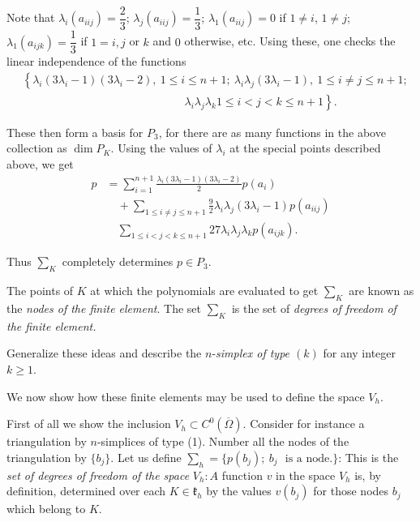 \begin{example}
Note that $\lambda_{i}(a_{iij})=\dfrac{2}{3}$;
$\lambda_{j}(a_{iij})=\dfrac{1}{3}$; $\lambda_{1}(a_{iij})=0$ if
$1\neq i$, $1\neq j$; $\lambda_{1}(a_{ijk})=\dfrac{1}{3}$ if $1=i,j$
or $k$ and $0$ otherwise, etc. Using these, one checks the linear
independence of the functions
\begin{align*}
&  \left\{\lambda_{i}(3\lambda_{i}-1)(3\lambda_{i}-2),\ 1\leq i\leq
n+1;\ \lambda_{i}\lambda_{j}(3\lambda_{i}-1),\ 1\leq i\neq j\leq
n+1; \right.\\
& \hspace{6cm} \left.  \lambda_{i}\lambda_{j}\lambda_{k}1\leq i<j<k\leq n+1\right\}.
\end{align*}

These then form a basis for $P_{3}$, for there are as many functions
in the above collection as $\dim P_{K}$. Using the values of
$\lambda_{i}$ at the special points described above, we get
\begin{equation*}
\begin{split}
p &=
\sum^{n+1}_{i=1}\frac{\lambda_{i}(3\lambda_{i}-1)(3\lambda_{i}-2)}{2}p(a_{i})\\
&\quad + \sum_{1\leq i\neq j\leq
  n+1}\frac{9}{2}\lambda_{i}\lambda_{j}(3\lambda_{i}-1)p(a_{iij})\\ 
&\quad \sum_{1\leq i<j<k\leq
  n+1}27\lambda_{i}\lambda_{j}\lambda_{k}p(a_{ijk}). 
\end{split}\tag{4.6}\label{chap4-eq4.6}
\end{equation*}\pageoriginale

Thus $\sum_{K}$ completely determines $p\in P_{3}$.
\end{example}

The points of $K$ at which the polynomials are evaluated to get
$\sum_{K}$ are known as the {\em nodes of the finite element}. The set
$\sum_{K}$ is the set of {\em degrees of freedom of the finite
  element.}

\begin{exercise}\label{chap4-exer4.1}
Generalize these ideas and describe the $n$-{\em simplex of type
  $(k)$} for any integer $k\geq 1$. 
\end{exercise}

We now show how these finite elements may be used to define the space
$V_{h}$.

First of all we show the inclusion $V_{h}\subset
C^{0}(\overline{\Omega})$. Consider for instance a triangulation by
$n$-simplices of type (1). Number all the nodes of the triangulation
by $\{b_{j}\}$. Let us define $\sum_{h}=\{p(b_{j});\ b_{j}\text{~ is a
  node.}\}$: This is the {\em set of degrees of freedom of the space}
$V_{h}:A$ function $v$ in the space $V_{h}$ is, by definition,
determined over each $K\in\mathfrak{k}_{h}$ by the values $v(b_{j})$
for those nodes $b_{j}$ which belong to $K$.

